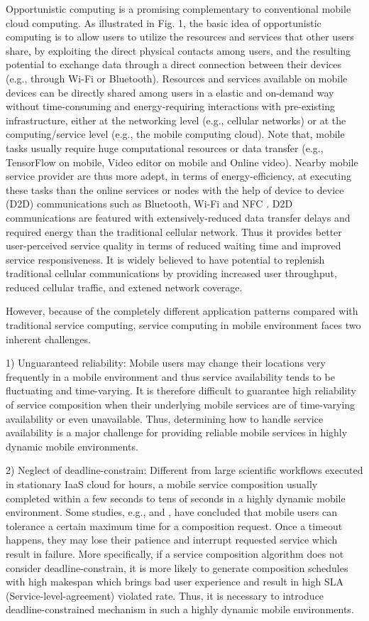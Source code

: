 \documentclass[journal]{IEEEtran}
\begin{document}
Opportunistic computing is a promising complementary to conventional mobile cloud computing. As illustrated in Fig. 1, the basic idea of opportunistic computing is to allow users to utilize the resources and services that other users share, by exploiting the direct physical contacts among users, and the resulting potential to exchange data through a direct connection between their devices (e.g., through Wi-Fi or Bluetooth). Resources and services available on mobile devices can be directly shared among users in a elastic and on-demand way without time-consuming and energy-requiring interactions with pre-existing infrastructure, either at the networking level (e.g., cellular networks) or at the computing/service level (e.g., the mobile computing cloud). 
Note that, mobile tasks usually require huge computational resources or data transfer (e.g., TensorFlow on mobile, Video editor on mobile and Online video). Nearby mobile service provider are thus more adept, in terms of energy-efficiency, at executing these tasks than the online services or nodes with the help of device to device (D2D) communications such as Bluetooth, Wi-Fi and NFC \cite{balani2007energy}. D2D communications are featured with extensively-reduced data transfer delays and required energy than the traditional cellular network. Thus it provides better user-perceived service quality in terms of reduced waiting time and improved service responsiveness. It is widely believed to have potential to replenish traditional cellular communications by providing increased user throughput, reduced cellular traffic, and extened network coverage.

However, because of the completely different application patterns compared with traditional service computing, service computing in mobile environment faces two inherent challenges.

1) Unguaranteed reliability: Mobile users may change their locations very frequently in a mobile environment and thus service availability tends to be fluctuating and time-varying. It is therefore difficult to guarantee high reliability of service composition when their underlying mobile services are of time-varying availability or even unavailable. Thus, determining how to handle service availability is a major challenge for providing reliable mobile services in highly dynamic mobile environments.

2) Neglect of deadline-constrain: Different from large scientific workflows executed in stationary IaaS cloud for hours, a mobile service composition usually completed within a few seconds to tens of seconds in a highly dynamic mobile environment. Some studies, e.g., \cite{Niida2010} and \cite{zhou2016define} , have concluded that mobile users can tolerance a certain maximum time for a composition request. Once a timeout happens, they may lose their patience and interrupt requested service which result in failure. More specifically, if a service composition algorithm does not consider deadline-constrain, it is more likely to generate composition schedules with high makespan which brings bad user experience and result in high SLA (Service-level-agreement) violated rate. Thus, it is necessary to introduce deadline-constrained mechanism in such a highly dynamic mobile environments.
\end{document}
